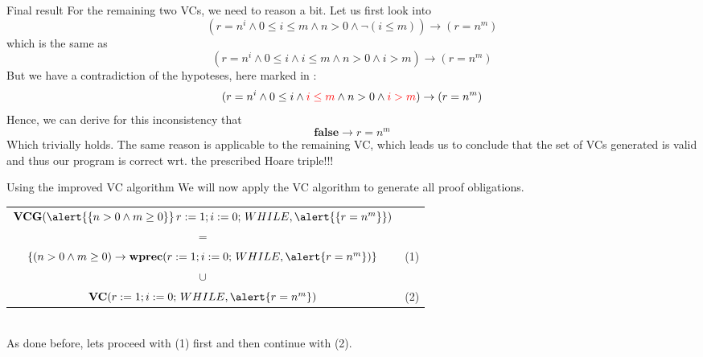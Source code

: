 \documentclass[aspectratio=169]{beamer}
\begin{document}
\begin{slide}{Final result}
For the remaining two VCs, we need to reason a bit. Let us first look into\\\vspace{0.3cm}
\small{$$(r = n^i \land 0 \leq i \leq m \land n > 0 \land \neg(i \leq m)) \to (r = n^m)$$}
which is the same as 
\small{$$(r = n^i \land 0 \leq i \land i \leq m \land n > 0 \land i > m) \to (r = n^m)$$}
But we have a contradiction of the hypoteses, here marked in {\color{red}{red}}:
\small{$$(r = n^i \land 0 \leq i \land {\color{red}{i \leq m}} \land n > 0 \land {\color{red}{i > m}}) \to (r = n^m)$$}
Hence, we can derive for this inconsistency that
\small{$$\mathbf{false} \to r = n^m$$}
Which trivially holds. The same reason is applicable to the remaining VC, which leads us to conclude that the set of VCs generated is valid and thus our program is correct wrt. the prescribed Hoare triple!!!
\end{slide}


\begin{slide}{Using the improved VC algorithm}
  We will now apply the VC algorithm to generate all proof obligations.\\\vspace{0.5cm}
\small{
\begin{tabular}{cc}
  $\textbf{VCG}(\alert{\{n > 0 \land m \geq 0\}}\,r := 1;i := 0;\,WHILE,\alert{\{r = n^m\}})$  \\
  $=$\\
  $\{(n > 0 \land m \geq 0) \to \textbf{wprec}(r := 1;i := 0;\,WHILE,\alert{r = n^m})\}$ & (1)\\
  $\cup$\\
  $\textbf{VC}(r := 1;i := 0;\,WHILE,\alert{r = n^m})$ & (2)
\end{tabular}}\\\vspace{0.5cm}
As done before, lets proceed with (1) first and then continue with (2).
\end{slide}
\end{document}
